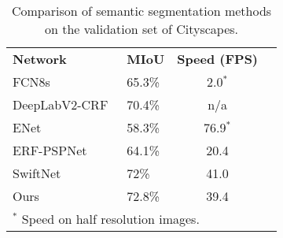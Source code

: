 \documentclass[letterpaper, 10 pt, conference]{ieeeconf}
\begin{document}
\begin{table}[htbp]
\centering
\caption{Comparison of semantic segmentation methods on the validation set of Cityscapes.}
\label{table:compare}
\begin{tabular}{llll}
\multicolumn{1}{l|}{\textbf{Network}} & \multicolumn{1}{l|}{\textbf{MIoU}} &  \multicolumn{1}{l}{\textbf{Speed (FPS)}}  &  \\ \cline{1-3}
\multicolumn{1}{l|}{FCN8s~\cite{fcn}}            & \multicolumn{1}{l|}{65.3\%}        &     \multicolumn{1}{c}{2.0$^{\mathrm{*}}$}                &  \\
\multicolumn{1}{l|}{DeepLabV2-CRF~\cite{deeplab}}    & \multicolumn{1}{l|}{70.4\%}        & \multicolumn{1}{c}{n/a}                 &  \\
\multicolumn{1}{l|}{ENet~\cite{paszke2016enet}}             & \multicolumn{1}{l|}{58.3\%}        & \multicolumn{1}{c}{76.9$^{\mathrm{*}}$}            &  \\
\multicolumn{1}{l|}{ERF-PSPNet~\cite{erf_pspnet}}       & \multicolumn{1}{l|}{64.1\%}        & \multicolumn{1}{c}{20.4}                &  \\
\multicolumn{1}{l|}{SwiftNet~\cite{swiftnet}}         & \multicolumn{1}{l|}{72\%}          & \multicolumn{1}{c}{41.0}                &  \\ \cline{1-3}
\multicolumn{1}{l|}{Ours}             & \multicolumn{1}{l|}{72.8\%}        & \multicolumn{1}{c}{39.4}                &  \\
\multicolumn{3}{l}{$^{\mathrm{*}}$ Speed on half resolution images.}
\end{tabular}
\end{table}
\end{document}
